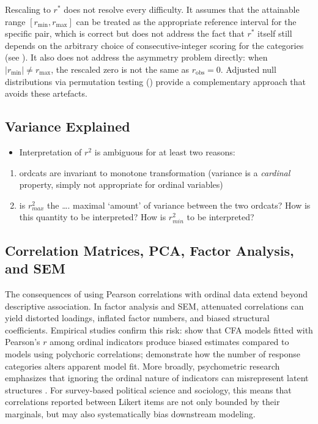 \documentclass[
  12pt,
]{article}
\providecommand{\tightlist}{%
  \setlength{\itemsep}{0pt}\setlength{\parskip}{0pt}}
\theoremstyle{plain}
\theoremstyle{definition}
\theoremstyle{remark}
\begin{document}
Rescaling to \(r^*\) does not resolve every difficulty. It assumes that
the attainable range \([r_{\min}, r_{\max}]\) can be treated as the
appropriate reference interval for the specific pair, which is correct
but does not address the fact that \(r^*\) itself still depends on the
arbitrary choice of consecutive-integer scoring for the categories (see
). It also does not address the asymmetry
problem directly: when \(|r_{\min}| \neq r_{\max}\), the rescaled zero
is not the same as \(r_{\text{obs}} = 0\). Adjusted null distributions
via permutation testing () provide a
complementary approach that avoids these artefacts.

\subsection{Variance Explained}\label{variance-explained}

\begin{itemize}
\tightlist
\item
  Interpretation of \(r^2\) is ambiguous for at least two reasons:
\end{itemize}

\begin{enumerate}
\def\labelenumi{\arabic{enumi}.}
\tightlist
\item
  ordcats are invariant to monotone transformation (variance is a
  \emph{cardinal} property, simply not appropriate for ordinal
  variables)
\item
  is \(r^2_{max}\) the \ldots. maximal `amount' of variance between the
  two ordcats? How is this quantity to be interpreted? How is
  \(r^2_{min}\) to be interpreted?
\end{enumerate}

\subsection{Correlation Matrices, PCA, Factor Analysis, and
SEM}\label{sec-matrices}

The consequences of using Pearson correlations with ordinal data extend
beyond descriptive association. In factor analysis and SEM, attenuated
correlations can yield distorted loadings, inflated factor numbers, and
biased structural coefficients. Empirical studies confirm this risk:
\autocite{flor04-empirical} show that CFA models fitted with Pearson's
\(r\) among ordinal indicators produce biased estimates compared to
models using polychoric correlations; \autocite{gree97-effect}
demonstrate how the number of response categories alters apparent model
fit. More broadly, psychometric research emphasizes that ignoring the
ordinal nature of indicators can misrepresent latent structures
\autocite{lord52-theory,muth84-general,bart11-latent}. For survey-based
political science and sociology, this means that correlations reported
between Likert items are not only bounded by their marginals, but may
also systematically bias downstream modeling.
\end{document}

